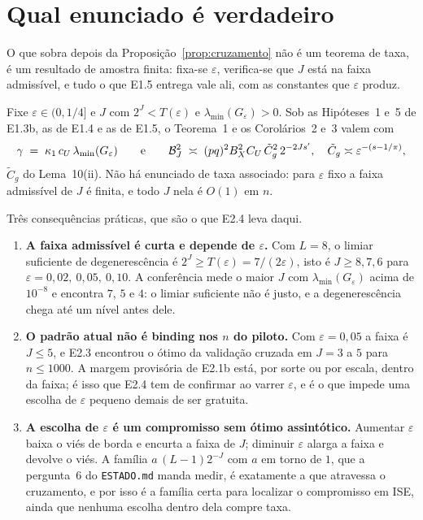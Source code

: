 \documentclass[11pt,a4paper]{article}
\newcommand{\lmin}{\lambda_{\min}}
\newcommand{\eps}{\varepsilon}
\begin{document}
\section{Qual enunciado é verdadeiro}

O que sobra depois da Proposição~\ref{prop:cruzamento} não é um teorema de
taxa, é um resultado de amostra finita: fixa-se $\eps$, verifica-se que $J$
está na faixa admissível, e tudo o que E1.5 entrega vale ali, com as
constantes que $\eps$ produz.

\begin{corollary}\label{cor:amostra-finita}
Fixe $\eps\in(0,1/4]$ e $J$ com $2^{J} < T(\eps)$ e $\lmin(G_{\eps}) > 0$.
Sob as Hipóteses~1 e~5 de E1.3b, as de E1.4 e as de E1.5, o Teorema~1 e os
Corolários~2 e~3 valem com
\[
  \gamma \;=\; \kappa_{1}\,c_{U}\,\lmin(G_{\eps})
  \qquad\text{e}\qquad
  \mathcal{B}_{J}^{2}\;\asymp\;(pq)^{2}B_{X}^{2}C_{U}\,\tilde C_{g}^{2}\,
  2^{-2J\seff}, \quad
  \tilde C_{g}\asymp\eps^{-(s-1/\pi)} ,
\]
$\tilde C_{g}$ do Lema~10(ii). Não há enunciado de taxa associado: para
$\eps$ fixo a faixa admissível de $J$ é finita, e todo $J$ nela é $O(1)$ em
$n$.
\end{corollary}

Três consequências práticas, que são o que E2.4 leva daqui.

\begin{enumerate}[label=\textup{(\alph*)}, leftmargin=*]
  \item \textbf{A faixa admissível é curta e depende de $\eps$.} Com $L = 8$,
    o limiar suficiente de degenerescência é $2^{J}\ge T(\eps) = 7/(2\eps)$,
    isto é $J \ge 8, 7, 6$ para $\eps = 0{,}02,\ 0{,}05,\ 0{,}10$. A
    conferência mede o maior $J$ com $\lmin(G_{\eps})$ acima de $10^{-8}$ e
    encontra $7$, $5$ e $4$: o limiar suficiente não é justo, e a
    degenerescência chega até um nível antes dele.
  \item \textbf{O padrão atual não é binding nos $n$ do piloto.} Com
    $\eps = 0{,}05$ a faixa é $J\le 5$, e E2.3 encontrou o ótimo da validação
    cruzada em $J = 3$ a $5$ para $n\le 1000$. A margem provisória de E2.1b
    está, por sorte ou por escala, dentro da faixa; é isso que E2.4 tem de
    confirmar ao varrer $\eps$, e é o que impede uma escolha de $\eps$ pequeno
    demais de ser gratuita.
  \item \textbf{A escolha de $\eps$ é um compromisso sem ótimo assintótico.}
    Aumentar $\eps$ baixa o viés de borda e encurta a faixa de $J$; diminuir
    $\eps$ alarga a faixa e devolve o viés. A família $a\,(L-1)2^{-J}$ com $a$
    em torno de $1$, que a pergunta~6 do \texttt{ESTADO.md} manda medir, é
    exatamente a que atravessa o cruzamento, e por isso é a família certa para
    localizar o compromisso em ISE, ainda que nenhuma escolha dentro dela
    compre taxa.
\end{enumerate}
\end{document}
